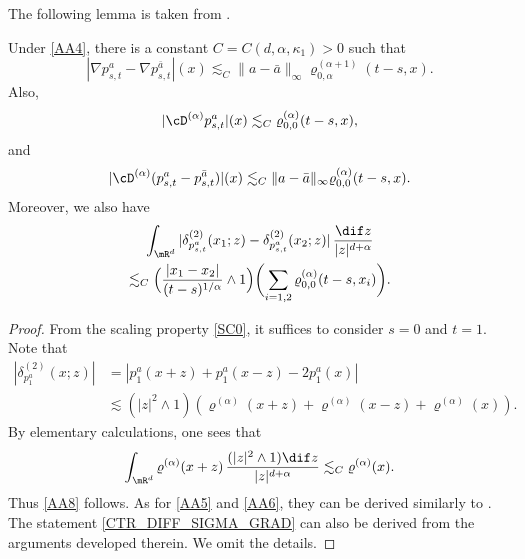 The following lemma is taken from \cite[Lem.\,3.2 \& 3.3]{Ch-Zh1}.
\begin{lemma} \label{Le210}
Under \eqref{AA4}, there is a constant $C=C(d,\alpha,\kappa_1)>0$ such that
\begin{equation}\label{CTR_DIFF_SIGMA_GRAD}
|\nabla p_{s,t}^a-\nabla p_{s,t}^{\bar a}|(x)\lesssim_C \|a-\bar a\|_\infty\varrho^{(\alpha+1)}_{0,\alpha}(t-s, x).
\end{equation}
Also,
\begin{equation}\label{AA8}
|\cD^{(\alpha)}p_{s,t}^a|(x)\lesssim_C\varrho^{(\alpha)}_{0,0}(t-s, x),
\end{equation}
and
\begin{equation}\label{AA5}
|\cD^{(\alpha)}(p_{s,t}^a-p_{s,t}^{\bar a})|(x)\lesssim_C\|a-\bar a\|_\infty\varrho^{(\alpha)}_{0,0}(t-s, x).
\end{equation}
Moreover, we also have
\begin{multline}\label{AA6}
\int_{\mR^d}|\delta^{(2)}_{p_{s,t}^a}(x_1;z)-\delta^{(2)}_{p_{s,t}^a}(x_2;z)|\,\frac{\dif z}{|z|^{d+\alpha}}
\\\lesssim_C\Bigl(\frac{|x_1-x_2|}{(t-s)^{1/\alpha}}\wedge 1\Bigr)\biggl(\sum_{i=1,2}\varrho^{(\alpha)}_{0,0}(t-s, x_i)\biggr).
\end{multline}
\end{lemma}
\begin{proof}
From the scaling property \eqref{SC0}, it suffices to consider $s=0$ and $t=1$. Note that
\begin{align*}
|\delta^{(2)}_{p_1^a}(x;z)|&=|p_1^a(x+z)+p_1^a(x-z)-2p_1^a(x)|\\
&\lesssim(|z|^2\wedge 1)(\varrho^{(\alpha)}(x+z)+\varrho^{(\alpha)}(x-z)+\varrho^{(\alpha)}(x)).
\end{align*}
By elementary calculations, one sees that
\begin{equation}\label{AA86}
\int_{\mR^d}\varrho^{(\alpha)}(x+z)\,\frac{(|z|^2\wedge 1)\dif z}{|z|^{d+\alpha}}\lesssim_C\varrho^{(\alpha)}(x).
\end{equation}
Thus \eqref{AA8} follows. As for \eqref{AA5} and \eqref{AA6}, they can be derived similarly
to \hbox{\cite[Lem.\,2.7 \& 2.8]{Ch-Zh20}}. The statement \eqref{CTR_DIFF_SIGMA_GRAD} can also be derived
from the arguments developed therein.
We omit the details.
\end{proof}

